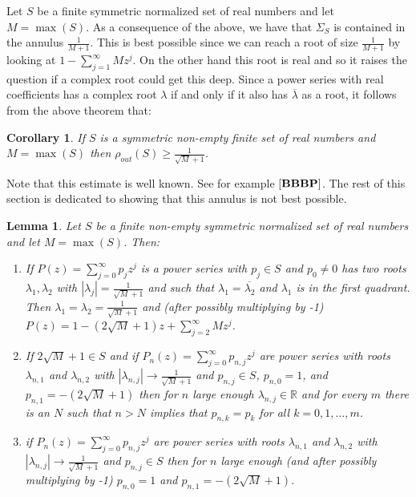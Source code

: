 \documentclass[11pt]{amsart}
\newtheorem{corollary}[theorem]{Corollary}
\newtheorem{lemma}[theorem]{Lemma}
\numberwithin{theorem}{section} %
\numberwithin{corollary}{section}
\numberwithin{lemma}{section}
\numberwithin{proposition}{section}
\numberwithin{definition}{section}
\begin{document}
Let $S$ be a finite symmetric normalized set of real numbers and let $M = \max(S)$. As a consequence of the above, we have that $\Sigma_S$ is contained in the annulus $\frac{1}{M+1}$. This is best possible since we can reach a root of size $\frac{1}{M+1}$ by looking at $1 - \sum_{j=1}^\infty Mz^j$. On the other hand this root is real and so it raises the question if a complex root could get this deep. Since a power series with real coefficients has a complex root $\lambda$ if and only if it also has $\overline{\lambda}$ as a root, it follows from the above theorem that:


\begin{corollary}
If $S$ is a symmetric non-empty finite set of real numbers and $M = \max(S)$ then $\rho_{out}(S) \geqslant \frac{1}{\sqrt{M}+1}$.
\end{corollary}

Note that this estimate is well known. See for example $\bf{[BBBP]}$. The rest of this section is dedicated to showing that this annulus is not best possible.


\begin{lemma}
Let $S$ be a finite non-empty symmetric normalized set of real numbers and let $M = \max(S)$. Then:
\begin{enumerate}
\item If $P(z) = \sum_{j=0}^\infty p_jz^j$ is a power series with $p_j \in S$ and $p_0 \neq 0$ has two roots $\lambda_1, \lambda_2$ with $|\lambda_j| = \frac{1}{\sqrt{M}+1}$ and such that $\lambda_1 = \overline{\lambda_2}$ and $\lambda_1$ is in the first quadrant. Then $\lambda_1 = \lambda_2 = \frac{1}{\sqrt{M}+1}$ and (after possibly multiplying by -1) $P(z) = 1 - (2\sqrt{M}+1)z + \sum_{j=2}^\infty Mz^j$.

\item If $2\sqrt{M} + 1 \in S$ and if $P_n(z) = \sum_{j=0}^\infty p_{n, j}z^j$ are power series with roots $\lambda_{n, 1}$ and $\lambda_{n, 2}$ with $|\lambda_{n, j}| \rightarrow \frac{1}{\sqrt{M}+1}$ and $p_{n, j} \in S$, $p_{n, 0} = 1$, and $p_{n, 1} = -(2\sqrt{M}+1)$ then for $n$ large enough $\lambda_{n, j} \in \mathbb{R}$ and for every $m$ there is an $N$ such that $n > N$ implies that $p_{n, k} = p_k$ for all $k = 0, 1, ..., m$.

\item if $P_n(z) = \sum_{j=0}^\infty p_{n, j}z^j$ are power series with roots $\lambda_{n, 1}$ and $\lambda_{n, 2}$ with $|\lambda_{n, j}| \rightarrow \frac{1}{\sqrt{M}+1}$ and $p_{n, j} \in S$ then for $n$ large enough (and after possibly multiplying by -1) $p_{n, 0} = 1$ and $p_{n, 1} = -(2\sqrt{M}+1)$.
\end{enumerate}
\end{lemma}
\end{document}
